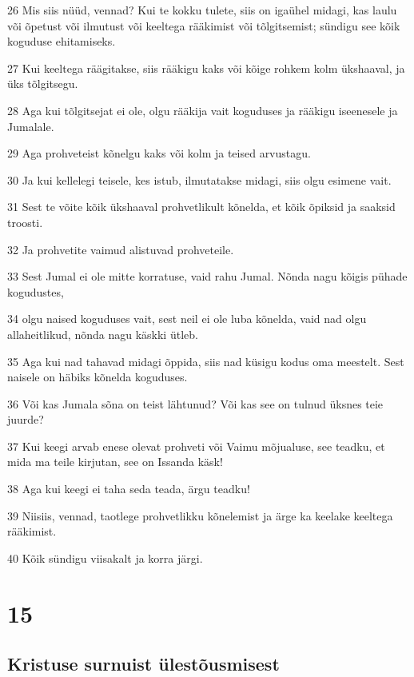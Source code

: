 \par 26 Mis siis nüüd, vennad? Kui te kokku tulete, siis on igaühel midagi, kas laulu või õpetust või ilmutust või keeltega rääkimist või tõlgitsemist; sündigu see kõik koguduse ehitamiseks.
\par 27 Kui keeltega räägitakse, siis rääkigu kaks või kõige rohkem kolm ükshaaval, ja üks tõlgitsegu.
\par 28 Aga kui tõlgitsejat ei ole, olgu rääkija vait koguduses ja rääkigu iseenesele ja Jumalale.
\par 29 Aga prohveteist kõnelgu kaks või kolm ja teised arvustagu.
\par 30 Ja kui kellelegi teisele, kes istub, ilmutatakse midagi, siis olgu esimene vait.
\par 31 Sest te võite kõik ükshaaval prohvetlikult kõnelda, et kõik õpiksid ja saaksid troosti.
\par 32 Ja prohvetite vaimud alistuvad prohveteile.
\par 33 Sest Jumal ei ole mitte korratuse, vaid rahu Jumal. Nõnda nagu kõigis pühade kogudustes,
\par 34 olgu naised koguduses vait, sest neil ei ole luba kõnelda, vaid nad olgu allaheitlikud, nõnda nagu käskki ütleb.
\par 35 Aga kui nad tahavad midagi õppida, siis nad küsigu kodus oma meestelt. Sest naisele on häbiks kõnelda koguduses.
\par 36 Või kas Jumala sõna on teist lähtunud? Või kas see on tulnud üksnes teie juurde?
\par 37 Kui keegi arvab enese olevat prohveti või Vaimu mõjualuse, see teadku, et mida ma teile kirjutan, see on Issanda käsk!
\par 38 Aga kui keegi ei taha seda teada, ärgu teadku!
\par 39 Niisiis, vennad, taotlege prohvetlikku kõnelemist ja ärge ka keelake keeltega rääkimist.
\par 40 Kõik sündigu viisakalt ja korra järgi.


\chapter{15}

\section*{Kristuse surnuist ülestõusmisest}


